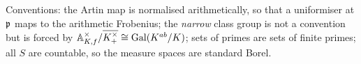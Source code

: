 \medskip\noindent
Conventions: the Artin map is normalised arithmetically, so that a uniformiser at $\mathfrak{p}$
maps to the arithmetic Frobenius; the \emph{narrow} class group is not a convention but is
forced by $\mathbb{A}_{K,f}^\times/\overline{K^\times_+}\cong\operatorname{Gal}(K^{ab}/K)$; sets of primes are
sets of finite primes; all $S$ are countable, so the measure spaces are standard Borel.
